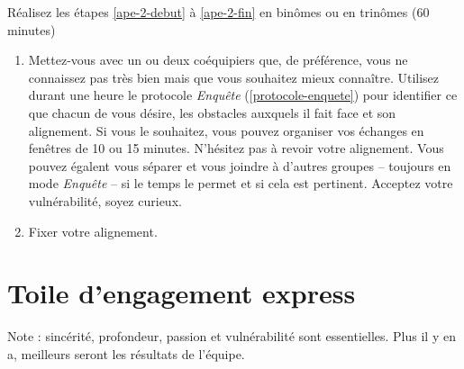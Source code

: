 \documentclass[paper=6in:9in,pagesize=pdftex,headinclude=on,footinclude=on,11pt]{scrbook}
\newcommand*{\numref}[1]{{\hyperref[{#1}]{\autoref*{#1}}}}
\let\oldsection\section
\renewcommand\section{\clearpage\oldsection}
\begin{document}
Réalisez les étapes \ref{ape-2-debut} à \ref{ape-2-fin} en binômes ou en trinômes (60 minutes)

\begin{enumerate}[resume]
	\item \label{ape-2-debut} Mettez-vous avec un ou deux coéquipiers que, de préférence, vous ne connaissez pas très bien mais que vous souhaitez mieux
	      connaître. Utilisez durant une heure le protocole \emph{Enquête} (\numref{protocole-enquete}) pour identifier ce que chacun de vous désire,
	      les obstacles auxquels il fait face et son alignement. Si vous le souhaitez, vous pouvez organiser vos échanges en fenêtres de 10 ou 15 minutes.
	      N'hésitez pas à revoir votre alignement. Vous pouvez égalent vous séparer et vous joindre à d'autres groupes -- toujours en mode
	      \emph{Enquête} -- si le temps le permet et si cela est pertinent. Acceptez votre vulnérabilité, soyez curieux.
	\item \label{ape-2-fin} Fixer votre alignement.
\end{enumerate}

\section{Toile d'engagement express} \label{toile-engagement-express}

Note : sincérité, profondeur, passion et vulnérabilité sont essentielles. Plus il y en a, meilleurs seront les résultats de l'équipe.
\end{document}

